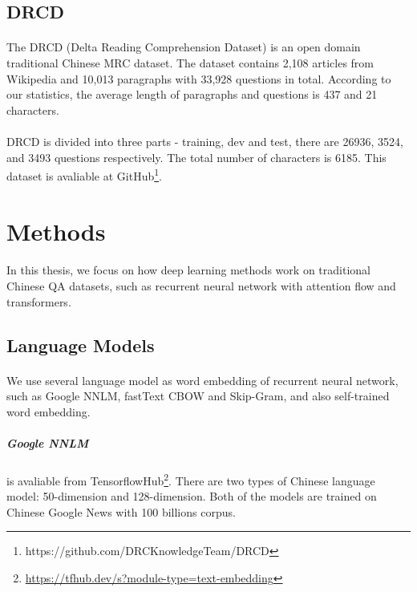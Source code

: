 \documentclass{article}
\begin{document}
\subsection{DRCD}
\paragraph{}
The DRCD\cite{shao2018drcd} (Delta Reading Comprehension Dataset) is an open domain traditional Chinese MRC dataset. The dataset contains 2,108 articles from Wikipedia and 10,013 paragraphs with 33,928 questions in total. According to our statistics, the average length of paragraphs and questions is 437 and 21 characters.

\paragraph{}
DRCD is divided into three parts - training, dev and test, there are 26936, 3524, and 3493 questions respectively. The total number of characters is 6185. This dataset is avaliable at GitHub\footnote{\label{drcd_github}https://github.com/DRCKnowledgeTeam/DRCD}.

\section{Methods}
\paragraph{}
In this thesis, we focus on how deep learning methods work on traditional Chinese QA datasets, such as recurrent neural network with attention flow and transformers.

\subsection{Language Models}
\paragraph{}
We use several language model as word embedding of recurrent neural network, such as Google NNLM, fastText\cite{bojanowski2017enriching} CBOW and Skip-Gram, and also self-trained word embedding.

\subparagraph{Google NNLM} is avaliable from TensorflowHub\footnote{\url{https://tfhub.dev/s?module-type=text-embedding}}. There are two types of Chinese language model: 50-dimension and 128-dimension. Both of the models are trained on Chinese Google News with 100 billions corpus.
\end{document}
